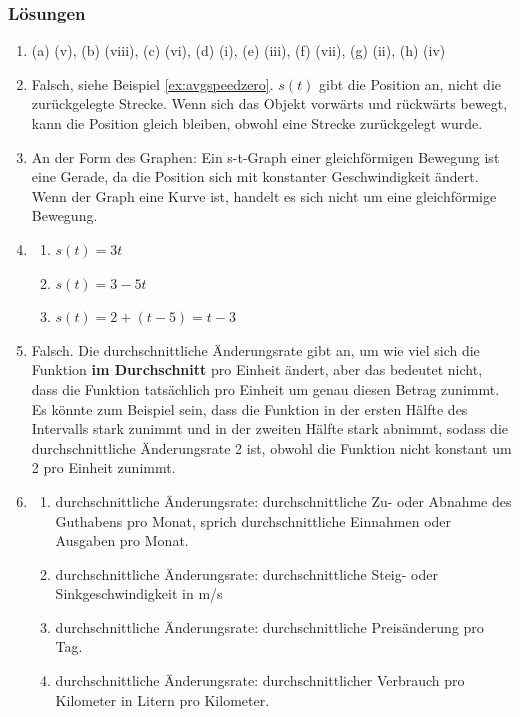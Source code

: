 \subsubsection*{Lösungen}
\begin{enumerate}
    \item (a) (v), (b) (viii), (c) (vi), (d) (i), (e) (iii), (f) (vii), (g) (ii), (h) (iv)
    \item Falsch, siehe Beispiel \ref{ex:avgspeedzero}. $s(t)$ gibt die Position an, nicht die zurückgelegte Strecke. Wenn sich das Objekt vorwärts und rückwärts bewegt, kann die Position gleich bleiben, obwohl eine Strecke zurückgelegt wurde.
    \item An der Form des Graphen: Ein s-t-Graph einer gleichförmigen Bewegung ist eine Gerade, da die Position sich mit konstanter Geschwindigkeit ändert. Wenn der Graph eine Kurve ist, handelt es sich nicht um eine gleichförmige Bewegung.
    \item \begin{enumerate}
              \item $s(t) = 3t$
              \item $s(t) = 3 - 5t$
              \item $s(t) = 2 + (t-5) = t - 3$
          \end{enumerate}
    \item Falsch. Die durchschnittliche Änderungsrate gibt an, um wie viel sich die Funktion \textbf{im Durchschnitt} pro Einheit ändert, aber das bedeutet nicht, dass die Funktion tatsächlich pro Einheit um genau diesen Betrag zunimmt. Es könnte zum Beispiel sein, dass die Funktion in der ersten Hälfte des Intervalls stark zunimmt und in der zweiten Hälfte stark abnimmt, sodass die durchschnittliche Änderungsrate 2 ist, obwohl die Funktion nicht konstant um 2 pro Einheit zunimmt.
    \item
          \begin{enumerate}
              \item durchschnittliche Änderungsrate: durchschnittliche Zu- oder Abnahme des Guthabens pro Monat, sprich durchschnittliche Einnahmen oder Ausgaben pro Monat.
              \item durchschnittliche Änderungsrate: durchschnittliche Steig- oder Sinkgeschwindigkeit in m/s
              \item durchschnittliche Änderungsrate: durchschnittliche Preisänderung pro Tag.
              \item durchschnittliche Änderungsrate: durchschnittlicher Verbrauch pro Kilometer in Litern pro Kilometer.
          \end{enumerate}
\end{enumerate}
\newpage
